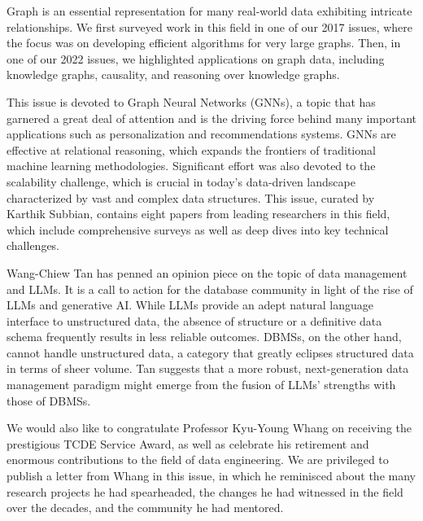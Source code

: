 \documentclass[11pt]{article}
\begin{document}
Graph is an essential representation for many real-world data exhibiting intricate relationships. We first surveyed work in this field in one of our 2017 issues, where the focus was on developing efficient algorithms for very large graphs. Then, in one of our 2022 issues, we highlighted applications on graph data, including knowledge graphs, causality, and reasoning over knowledge graphs.

This issue is devoted to Graph Neural Networks (GNNs), a topic that has garnered a great deal of attention and is the driving force behind many important applications such as personalization and recommendations systems. GNNs are effective at relational reasoning, which expands the frontiers of traditional machine learning methodologies. Significant effort was also devoted to the scalability challenge, which is crucial in today's data-driven landscape characterized by vast and complex data structures. This issue, curated by Karthik Subbian, contains eight papers from leading researchers in this field, which include comprehensive surveys as well as deep dives into key technical challenges.

Wang-Chiew Tan has penned an opinion piece on the topic of data management and LLMs. It is a call to action for the database community in light of the rise of LLMs and generative AI. While LLMs provide an adept natural language interface to unstructured data,  the absence of structure or a definitive data schema frequently results in less reliable outcomes. DBMSs, on the other hand, cannot handle unstructured data,  a category that greatly eclipses structured data in terms of sheer volume. Tan suggests that a more robust, next-generation data management paradigm might emerge from the fusion of LLMs' strengths with those of DBMSs.

We would also like to congratulate Professor Kyu-Young Whang on receiving the prestigious TCDE Service   Award, as well as celebrate his retirement and enormous contributions to the field of data engineering. We are privileged to publish a letter from Whang in this issue, in which he reminisced about the many research projects he had spearheaded, the changes he had witnessed in the field over the decades, and the community he had mentored.
\end{document}
